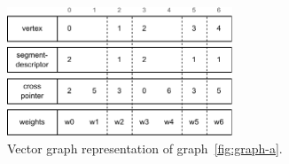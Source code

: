 \begin{figure}[tbp]
  \centering
    \includegraphics[width=0.6\textwidth]{Chapters/Figures/Images/graph_a_vgraph.pdf}
    \caption{Vector graph representation of graph~\ref{fig:graph-a}.}
\label{fig:graph-a-vgraph}
\end{figure}



